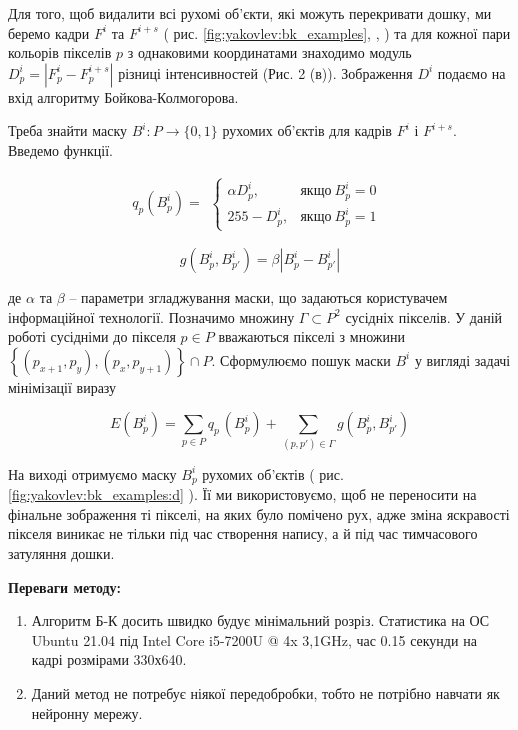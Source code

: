 Для того, щоб видалити всі рухомі об'єкти, які можуть перекривати дошку, ми
беремо кадри \(F^{i}\) та \(F^{i + s}\)  ( рис. \ref{fig:yakovlev:bk_examples}, 
,
) та для
кожної пари кольорів пікселів \(p\) з однаковими координатами знаходимо
модуль \(D_{p}^{i} = \left| F_{p}^{i} - F_{p}^{i + s} \right|\) різниці
інтенсивностей (Рис. 2 (в)). Зображення \(D^{i}\) подаємо на вхід
алгоритму Бойкова-Колмогорова.

Треба знайти маску $B^{i}:P \rightarrow \{0,1\}$ рухомих
об'єктів для кадрів \(F^{i}\) і \(F^{i + s}\). 
Введемо функції.

\begin{equation}
    q_{p}(B_{p}^{i}) =
    \begin{gathered}
        \begin{cases}
            \alpha D_{p}^{i}, & якщо\ B_{p}^{i} = 0 \\
            255 - D_{p}^{i}, & якщо\ B_{p}^{i} = 1
        \end{cases}
    \end{gathered}
\end{equation}

\begin{equation}
g(B_{p}^{i},B_{p'}^{i}) = \beta|B_{p}^{i} - B_{p'}^{i}|
\end{equation}

де \(\alpha\) та \(\beta\) -- параметри згладжування маски, що задаються
користувачем інформаційної технології. Позначимо множину
$\Gamma \subset P^{2}$ сусідніх пікселів. У даній роботі сусідніми до
пікселя \(p \in P\) вважаються пікселі з множини
\(\left\{ \left( p_{x + 1},p_{y} \right),\left( p_{x},p_{y + 1} \right) \right\} \cap P\).
Сформулюємо пошук маски \(B^{i}\) у вигляді задачі мінімізації виразу

\begin{equation}
    E\left( B_{p}^{i} \right) = \sum_{p \in P}^{}{q_{{p\ }}( B_{p}^{i}) +}\sum_{(p,p') \in \Gamma}^{}g(B_{p}^{i},B_{p'}^{i})
\end{equation}


На виході отримуємо маску \(B_{p}^{i}\) рухомих об'єктів ( рис.
\ref{fig:yakovlev:bk_examples:d} ).
Її ми використовуємо, щоб не переносити на фінальне зображення ті
пікселі, на яких було помічено рух, адже зміна яскравості пікселя
виникає не тільки під час створення напису, а й під час тимчасового
затуляння дошки.

\textbf{Переваги методу:} 
\begin{enumerate}
    \item Алгоритм Б-К досить швидко будує мінімальний розріз. Статистика на ОС 
        Ubuntu 21.04 під Intel Core i5-7200U @ 4x 3,1GHz, час 0.15 секунди на 
        кадрі розмірами 330х640.
    \item Даний метод не потребує ніякої передобробки, тобто не потрібно навчати
        як нейронну мережу.
\end{enumerate}

